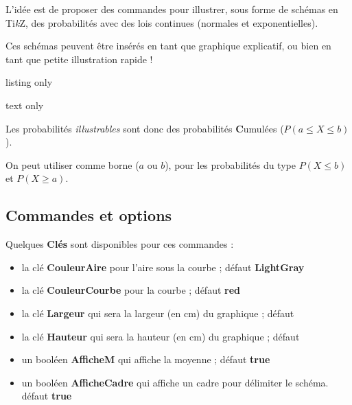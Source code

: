 \documentclass[a4paper,french,11pt]{article}
\providecommand\tikzlogo{Ti\textit{k}Z}
\let\TikZ\tikzlogo
\newcommand\ctex[1]{\tcbox[vignettelatex]{#1}}
\newcommand\Cle[1]{{\bfseries\sffamily\textlangle #1\textrangle}}
\begin{document}
\begin{tipblock}
L'idée est de proposer des commandes pour illustrer, sous forme de schémas en \TikZ, des probabilités avec des lois continues (normales et exponentielles).

\smallskip

Ces \og schémas \fg{} peuvent être insérés en tant que graphique explicatif, ou bien en tant que petite illustration rapide !
\end{tipblock}

\begin{PresCodeTexPL}{listing only}

\end{PresCodeTexPL}

\begin{PresCodeSortiePL}{text only}
\hfill{}\hspace{3cm}\hfill~
\end{PresCodeSortiePL}

\begin{cautionblock}
Les probabilités \textit{illustrables} sont donc des probabilités \textbf{C}umulées ($P(a\leqslant X\leqslant b)$).

\smallskip

On peut utiliser \ctex{*} comme borne ($a$ ou $b$), pour les probabilités du type $P(X\leqslant b)$ et $P(X \geqslant a)$.
\end{cautionblock}

\subsection{Commandes et options}

\begin{cautionblock}
Quelques \Cle{Clés} sont disponibles pour ces commandes :

\begin{itemize}
	\item la clé \Cle{CouleurAire} pour l'aire sous la courbe ; \hfill{}défaut \Cle{LightGray}
	\item la clé \Cle{CouleurCourbe} pour la courbe ; \hfill{}défaut \Cle{red}
	\item la clé \Cle{Largeur} qui sera la largeur (en cm) du graphique ; \hfill{}défaut \Cle{2}
	\item la clé \Cle{Hauteur} qui sera la hauteur (en cm) du graphique ; \hfill{}défaut \Cle{1}
	\item un booléen \Cle{AfficheM} qui affiche la moyenne ; \hfill{}défaut \Cle{true}
	\item un booléen \Cle{AfficheCadre} qui affiche un cadre pour délimiter le schéma. \hfill{}défaut \Cle{true}
\end{itemize}
\vspace*{-\baselineskip}\leavevmode
\end{cautionblock}
\end{document}
